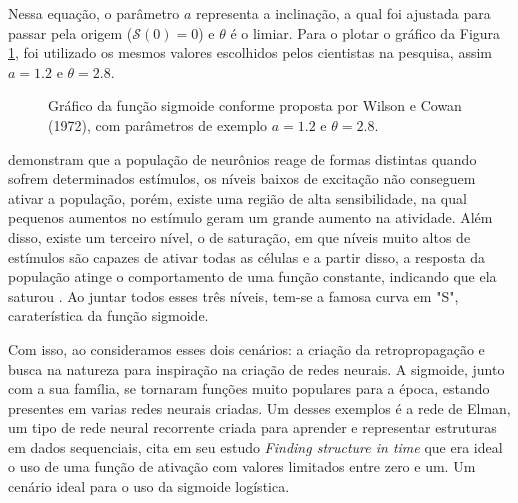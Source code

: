 Nessa equação, o parâmetro $a$ representa a inclinação, a qual foi ajustada para passar pela origem ($\mathcal{S}(0) = 0$) e $\theta$ 
é o limiar. Para o plotar o gráfico da Figura \ref{fig:sigmoide-wilson-e-cowan}, foi utilizado os mesmos valores escolhidos pelos cientistas na pesquisa, assim $a = 1.2$ e $\theta = 2.8$.

\begin{figure}[h!]


    \centering
    \caption{Gráfico da função sigmoide conforme proposta por Wilson e Cowan (1972), com parâmetros de exemplo $a=1.2$ e $\theta=2.8$.}
    \label{fig:sigmoide-wilson-e-cowan}
\end{figure}

\textcite{SigmoidWilsonCowan} demonstram que a população de neurônios reage de formas distintas quando sofrem determinados estímulos, os níveis baixos de excitação não conseguem ativar a população, porém, existe uma região de alta sensibilidade, na qual pequenos aumentos no estímulo geram um grande aumento na atividade. Além disso, existe um terceiro nível, o de saturação, em que níveis muito altos de estímulos são capazes de ativar todas as células e a partir disso, a resposta da população atinge o comportamento de uma função constante, indicando que ela saturou \parencite{SigmoidWilsonCowan}. Ao juntar todos esses três níveis, tem-se a famosa curva em "S", caraterística da função sigmoide.

Com isso, ao consideramos esses dois cenários: a criação da retropropagação e busca na natureza para inspiração na criação de redes neurais. A sigmoide, junto com a sua família, se tornaram funções muito populares para a época, estando presentes em varias redes neurais criadas. Um desses exemplos é a rede de Elman, um tipo de rede neural recorrente criada para aprender e representar estruturas em dados sequenciais, \textcite{ElmanNetwork} cita em seu estudo \textit{Finding structure in time} que era ideal o uso de uma função de ativação com valores limitados entre zero e um. Um cenário ideal para o uso da sigmoide logística.

